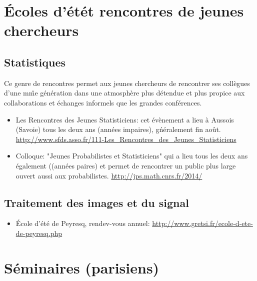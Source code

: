 \section{\'Ecoles d'\'et\' et rencontres de jeunes chercheurs}


\subsection{Statistiques}
Ce genre de rencontres permet aux jeunes chercheurs de rencontrer ses collègues d'une m\^me génération
dans une atmosphère plus détendue et plus propice aux collaborations et échanges informels que les
grandes conférences. 
\begin{itemize}

\item Les Rencontres des Jeunes Statisticiens: cet \'ev\`enement a lieu \`a Aussois (Savoie) tous les deux ans 
(ann\'ees impaires), 
g\'n\'eralement fin août. \url{http://www.sfds.asso.fr/111-Les_Rencontres_des_Jeunes_Statisticiens}

\item Colloque: "Jeunes Probabilistes et Statisticiens" qui a lieu tous les deux ans \'egalement ((ann\'ees paires)
et permet de rencontrer un public plus large ouvert aussi aux probabilistes. \url{http://jps.math.cnrs.fr/2014/}

\end{itemize}


\subsection{Traitement des images et du signal}



\begin{itemize}
\item \'Ecole d'été de Peyresq, rendev-vous annuel:
\url{http://www.gretsi.fr/ecole-d-ete-de-peyresq.php}
\end{itemize}


\section{Séminaires (parisiens)}

